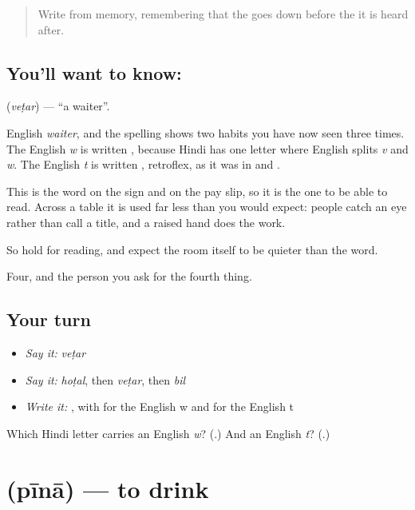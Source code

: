 \begin{quote}
Write \textbf{} from memory, remembering that the  goes down before the  it is heard after.
\end{quote}

\subsection*{You'll want to know: }
\textbf{} (\emph{veṭar}) — \textquotedblleft{}a waiter\textquotedblright{}.

English \emph{waiter}, and the spelling shows two habits you have now seen three times. The English \emph{w} is written , because Hindi has one letter where English splits \emph{v} and \emph{w}. The English \emph{t} is written , retroflex, as it was in \textbf{} and \textbf{}.

This is the word on the sign and on the pay slip, so it is the one to be able to read. Across a table it is used far less than you would expect: people catch an eye rather than call a title, and a raised hand does the work.

So hold  for reading, and expect the room itself to be quieter than the word.

\begin{grammarlens}[title={What you've built}]
Four, and the person you ask for the fourth thing.
\end{grammarlens}

\subsection*{Your turn}
\begin{itemize}
\raggedright
  \item \emph{Say it:} \emph{veṭar}
  \item \emph{Say it:} \emph{hoṭal}, then \emph{veṭar}, then \emph{bil}
  \item \emph{Write it:} , with  for the English w and  for the English t
\end{itemize}

\begin{tcolorbox}[breakable,colback=teal!4,colframe=teal!35!black,title={Before you move on}]
Which Hindi letter carries an English \emph{w}? (.) And an English \emph{t}? (.)
\end{tcolorbox}
\section[pīnā]{ (pīnā) — to drink}

